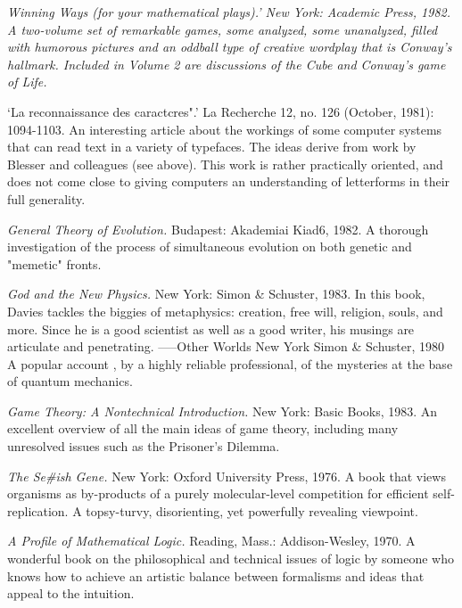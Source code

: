  {\sl Winning Ways (for your mathematical plays).' New York: Academic Press, 1982. A two-volume set of remarkable games, some analyzed, some unanalyzed, filled with humorous pictures and an oddball type of creative wordplay that is Conway's hallmark. Included in Volume 2 are discussions of the Cube and Conway's game of Life.} 

 `La reconnaissance des caractcres".' La Recherche 12, no. 126 (October, 1981): 1094-1103. An interesting article about the workings of some computer systems that can read text in a variety of typefaces. The ideas derive from work by Blesser and colleagues (see above). This work is rather practically oriented, and does not come close to giving computers an understanding of letterforms in their full generality.

 {\sl General Theory of Evolution.} Budapest: Akademiai Kiad6, 1982. A thorough investigation of the process of simultaneous evolution on both genetic and "memetic" fronts.

 {\sl God and the New Physics.} New York: Simon \& Schuster, 1983. In this book, Davies tackles the biggies of metaphysics: creation, free will, religion, souls, and more. Since he is a good scientist as well as a good writer, his musings are articulate and penetrating. -----Other Worlds New York Simon \& Schuster, 1980 A popular account , by a highly reliable professional, of the mysteries at the base of quantum mechanics.

 {\sl Game Theory: A Nontechnical Introduction.} New York: Basic Books, 1983. An excellent overview of all the main ideas of game theory, including many unresolved issues such as the Prisoner's Dilemma.

 {\sl The Se\#ish Gene.} New York: Oxford University Press, 1976. A book that views organisms as by-products of a purely molecular-level competition for efficient self- replication. A topsy-turvy, disorienting, yet powerfully revealing viewpoint.

 {\sl A Profile of Mathematical Logic.} Reading, Mass.: Addison-Wesley, 1970. A wonderful book on the philosophical and technical issues of logic by someone who knows how to achieve an artistic balance between formalisms and ideas that appeal to the intuition.

